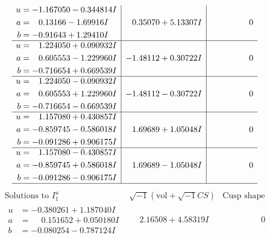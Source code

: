 \documentclass[1p]{elsarticle_modified}
\theoremstyle{definition}
\newcommand{\I}{\sqrt{-1}}
\begin{document}
$$\begin{array}{c|c|c}
\begin{aligned}
u &= -1.167050 - 0.344814 I \\
a &= \phantom{-}0.13166 - 1.69916 I \\
b &= -0.91643 + 1.29410 I\end{aligned}
 & \phantom{-}0.35070 + 5.13307 I & \phantom{-0.000000 } 0 \\ \hline\begin{aligned}
u &= \phantom{-}1.224050 + 0.090932 I \\
a &= \phantom{-}0.605553 - 1.229960 I \\
b &= -0.716654 + 0.669539 I\end{aligned}
 & -1.48112 + 0.30722 I & \phantom{-0.000000 } 0 \\ \hline\begin{aligned}
u &= \phantom{-}1.224050 - 0.090932 I \\
a &= \phantom{-}0.605553 + 1.229960 I \\
b &= -0.716654 - 0.669539 I\end{aligned}
 & -1.48112 - 0.30722 I & \phantom{-0.000000 } 0 \\ \hline\begin{aligned}
u &= \phantom{-}1.157080 + 0.430857 I \\
a &= -0.859745 - 0.586018 I \\
b &= -0.091286 + 0.906175 I\end{aligned}
 & \phantom{-}1.69689 + 1.05048 I & \phantom{-0.000000 } 0 \\ \hline\begin{aligned}
u &= \phantom{-}1.157080 - 0.430857 I \\
a &= -0.859745 + 0.586018 I \\
b &= -0.091286 - 0.906175 I\end{aligned}
 & \phantom{-}1.69689 - 1.05048 I & \phantom{-0.000000 } 0\\
 \hline 
 \end{array}$$\newpage$$\begin{array}{c|c|c}  
\text{Solutions to }I^u_{1}& \I (\text{vol} + \sqrt{-1}CS) & \text{Cusp shape}\\
 \hline 
\begin{aligned}
u &= -0.380261 + 1.187040 I \\
a &= \phantom{-}0.151652 + 0.050180 I \\
b &= -0.080254 - 0.787124 I\end{aligned}
 & \phantom{-}2.16508 + 4.58319 I & \phantom{-0.000000 } 0 \\ \hline\begin{aligned}

\end{aligned}
\end{array}$$
\end{document}
